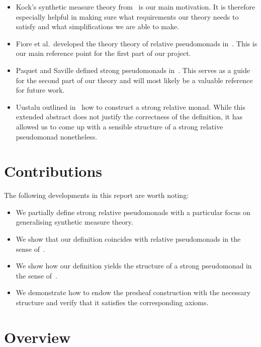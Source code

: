 \begin{itemize}
  \item Kock's synthetic measure theory from~\cite{kock2011} is our main motivation. It
    is therefore especially helpful in making sure what requirements our theory needs
    to satisfy and what simplifications we are able to make.
  \item Fiore et al.~developed the theory theory of relative pseudomonads in~\cite{fiore2017}.
    This is our main reference point for the first part of our project.
  \item  Paquet and Saville defined strong pseudomonads in~\cite{saville2023}. This
    serves as a guide for the second part of our theory and will most likely be a
    valuable reference for future work.
  \item Uustalu outlined in~\cite{tarmo} how to construct a strong relative monad. While
    this extended abstract does not justify the correctness of the definition, it has allowed
    us to come up with a sensible structure of a strong relative pseudomonad nonetheless.
\end{itemize}

\section{Contributions}

The following developments in this report are worth noting:

\begin{itemize}
  \item We partially define strong relative pseudomonads with a particular 
    focus on generalising synthetic measure theory.
  \item We show that our definition coincides with relative pseudomonads
    in the sense of~\cite{fiore2017}.
  \item We show how our definition yields the structure of a strong
    pseudomonad in the sense of~\cite{saville2023}.
  \item We demonstrate how to endow the presheaf construction with the
    necessary structure and verify that it satisfies the corresponding
    axioms.
\end{itemize}

\section{Overview}

